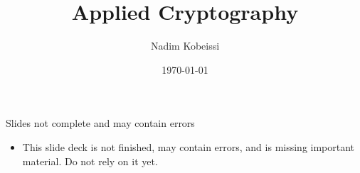 \documentclass[aspectratio=169, lualatex, handout]{beamer}
\title{Applied Cryptography}
\author{Nadim Kobeissi}
\institute{American University of Beirut}
\date{\today}
\begin{document}
\begin{frame}[plain]
	\titlepage
\end{frame}

\begin{frame}{Slides not complete and may contain errors}
	\begin{itemize}
		\item This slide deck is not finished, may contain errors, and is missing important material. Do not rely on it yet.
	\end{itemize}
\end{frame}

\begin{frame}[plain]
	\titlepage
\end{frame}
\end{document}
